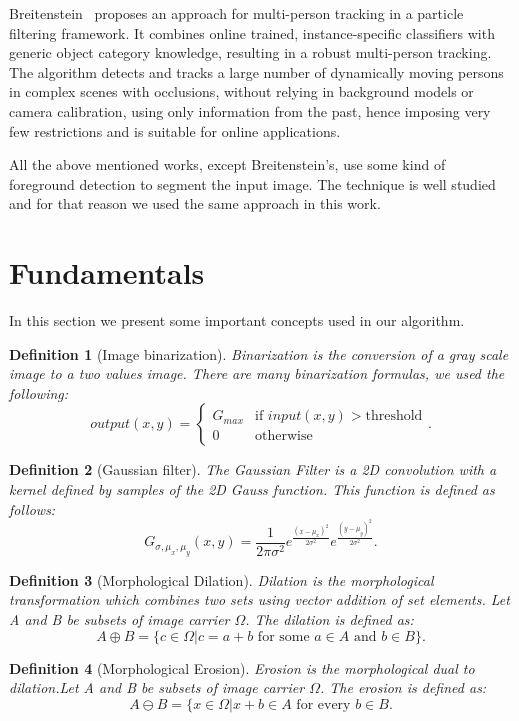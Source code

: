 \documentclass[10pt, conference]{IEEEtran}
\newtheorem{definition}{Definition}
\begin{document}
	Breitenstein~\cite{breitenstein2011online} proposes an approach for multi-person tracking in a particle filtering framework. It combines online trained, instance-specific classifiers with generic object category knowledge, resulting in a robust multi-person tracking. The algorithm detects and tracks a large number of dynamically moving persons in complex scenes with occlusions, without relying in background models or camera calibration, using only information from the past, hence imposing very few restrictions and is suitable for online applications.
	
	All the above mentioned works, except Breitenstein's, use some kind of foreground detection to segment the input image. The technique is well studied and for that reason we used the same approach in this work.
	
	\section{Fundamentals}
	In this section we present some important concepts used in our algorithm.
	\begin{definition}[Image binarization]
		Binarization is the conversion of a gray scale image to a two values image. There are many binarization formulas, we used the following:
		\[
		output(x,y) =
		\begin{cases}
		G_{max} & \text{if } input(x,y) > \text{threshold}\\
		0 & \text{otherwise}
		\end{cases}.
		\]
	\end{definition}
	\begin{definition}[Gaussian filter]
		The Gaussian Filter is a 2D convolution with a kernel defined by samples of the 2D Gauss function. This function is defined as follows:
		$$ G_{\sigma,\mu_{x},\mu_{y}}(x,y)=\frac{1}{2\pi\sigma^{2}}
		e^{\frac{(x-\mu_{x})^{2}}{2\sigma^{2}}}
		e^{\frac{(y-\mu_{y})^{2}}{2\sigma^{2}}}.$$
		
	\end{definition}
	\begin{definition}[Morphological Dilation]
		Dilation is the morphological transformation which combines two sets using vector addition of set elements. Let A and B be subsets of image carrier $\Omega$. The dilation is defined as: $$A \oplus B=\{c\in\Omega|c=a+b \text{ for some }a\in A\text{  and }b \in B\}.$$
	\end{definition}
	
	\begin{definition}[Morphological Erosion]
		Erosion is the morphological dual to dilation.Let A and B be subsets of image carrier $\Omega$. The erosion is defined as: $$A \ominus B=\{x\in\Omega | x+b \in A \text{ for every }b\in B.$$
	\end{definition}
	
\end{document}
